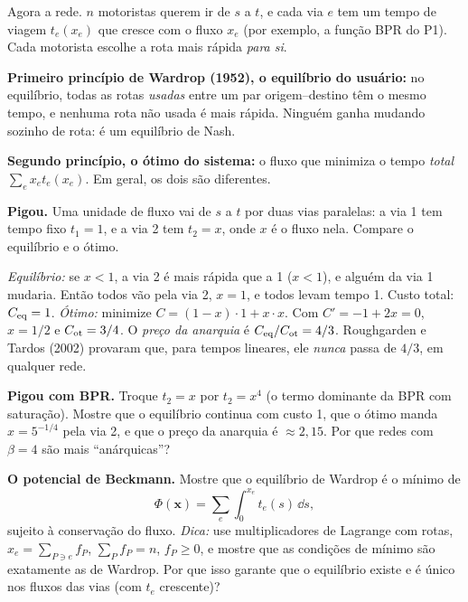 \documentclass[11pt]{article}
\begin{document}
Agora a rede. $n$ motoristas querem ir de $s$ a $t$, e cada via $e$ tem um tempo de viagem $t_e(x_e)$ que cresce com o fluxo $x_e$ (por exemplo, a função BPR do P1). Cada motorista escolhe a rota mais rápida \emph{para si}.

\begin{ideia}
\textbf{Primeiro princípio de Wardrop (1952), o equilíbrio do usuário:} no equilíbrio, todas as rotas \emph{usadas} entre um par origem--destino têm o mesmo tempo, e nenhuma rota não usada é mais rápida. Ninguém ganha mudando sozinho de rota: é um equilíbrio de Nash.

\textbf{Segundo princípio, o ótimo do sistema:} o fluxo que minimiza o tempo \emph{total} $\sum_e x_et_e(x_e)$. Em geral, os dois são diferentes.
\end{ideia}

\begin{exemplo}
\textbf{Pigou.} Uma unidade de fluxo vai de $s$ a $t$ por duas vias paralelas: a via 1 tem tempo fixo $t_1 = 1$, e a via 2 tem $t_2 = x$, onde $x$ é o fluxo nela. Compare o equilíbrio e o ótimo.
\end{exemplo}
\begin{solucao}
\emph{Equilíbrio:} se $x<1$, a via 2 é mais rápida que a 1 ($x<1$), e alguém da via 1 mudaria. Então todos vão pela via 2, $x=1$, e todos levam tempo 1. Custo total: $C_{\rm eq} = 1$. \emph{Ótimo:} minimize $C = (1-x)\cdot1+x\cdot x$. Com $C' = -1+2x = 0$, $x = 1/2$ e $C_{\rm ot} = 3/4$. O \emph{preço da anarquia} é $C_{\rm eq}/C_{\rm ot} = 4/3$. Roughgarden e Tardos (2002) provaram que, para tempos lineares, ele \emph{nunca} passa de $4/3$, em qualquer rede.
\end{solucao}

 \textbf{Pigou com BPR.} Troque $t_2 = x$ por $t_2 = x^4$ (o termo dominante da BPR com saturação). Mostre que o equilíbrio continua com custo 1, que o ótimo manda $x = 5^{-1/4}$ pela via 2, e que o preço da anarquia é $\approx2{,}15$. Por que redes com $\beta = 4$ são mais ``anárquicas''?

 \textbf{O potencial de Beckmann.} Mostre que o equilíbrio de Wardrop é o mínimo de
\[
\Phi(\bm x) = \sum_e\int_0^{x_e}t_e(s)\,\dd s,
\]
sujeito à conservação do fluxo. \emph{Dica:} use multiplicadores de Lagrange com rotas, $x_e = \sum_{P\ni e}f_P$, $\sum_Pf_P = n$, $f_P\ge0$, e mostre que as condições de mínimo são exatamente as de Wardrop. Por que isso garante que o equilíbrio existe e é único nos fluxos das vias (com $t_e$ crescente)?
\end{document}
